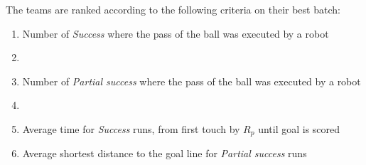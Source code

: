 The teams are ranked according to the following criteria on their best batch:
\begin{enumerate}
\item Number of \textit{Success} where the pass of the ball was executed by a robot
\item {}
\item Number of \textit{Partial success} where the pass of the ball was executed by a robot
\item {}
\item Average time for \textit{Success} runs,
  from first touch by $R_p$  until goal is scored
\item Average shortest distance to the goal line for \textit{Partial success} runs
\end{enumerate}
